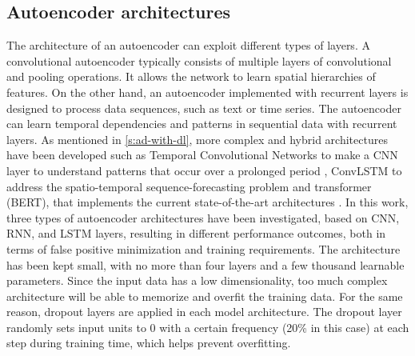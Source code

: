\subsection{Autoencoder architectures}
The architecture of an autoencoder can exploit different types of layers. A convolutional autoencoder typically consists of multiple layers of convolutional and pooling operations. It allows the network to learn spatial hierarchies of features. On the other hand, an autoencoder implemented with recurrent layers is designed to process data sequences, such as text or time series. The autoencoder can learn temporal dependencies and patterns in sequential data with recurrent layers. As mentioned in \autoref{s:ad-with-dl}, more complex and hybrid architectures have been developed such as Temporal Convolutional Networks to  make a CNN layer to understand patterns that occur over a prolonged period \cite{Lea_2016}, ConvLSTM to address the spatio-temporal sequence-forecasting problem \cite{Shi_2015} and transformer (BERT), that implements the current state-of-the-art architectures \cite{Devlin_2018}. In this work, three types of autoencoder architectures have been investigated, based on CNN, RNN, and LSTM layers, resulting in different performance outcomes, both in terms of false positive minimization and training requirements. The architecture has been kept small, with no more than four layers and a few thousand learnable parameters. Since the input data has a low dimensionality, too much complex architecture will be able to memorize and overfit the training data. For the same reason, dropout layers are applied in each model architecture. The dropout layer randomly sets input units to 0 with a certain frequency (20\% in this case) at each step during training time, which helps prevent overfitting. 

